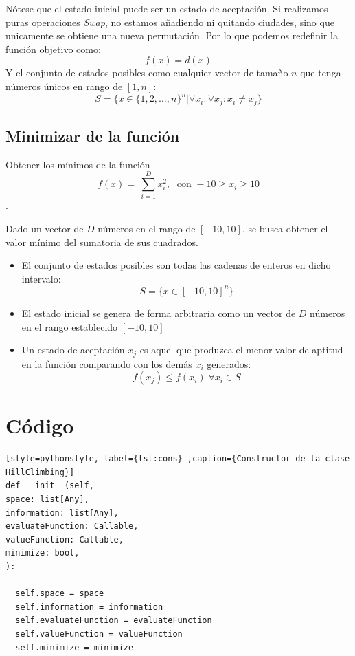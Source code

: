 \documentclass[12pt,twoside]{article}
\begin{document}
	
	
	Nótese que el estado inicial puede ser un estado de aceptación. Si realizamos puras operaciones \textit{Swap}, no estamos añadiendo ni quitando ciudades, sino que unicamente se obtiene una nueva permutación. Por lo que podemos redefinir la función objetivo como: \[ f(x) = d(x) \] Y el conjunto de estados posibles como cualquier vector de tamaño $n$ que tenga números únicos en rango de $[1,n]$: \[ S = \{ x \in \{1, 2, \dots, n  \}^n | \forall x_i \colon \forall x_j \colon x_i \neq x_j \}\]
	
	\subsection{Minimizar de la función}
	
	Obtener los mínimos de la función \[ f(x) = \ \sum_{i = 1}^{D} x_i^2, \; \text{ con } -10 \geq x_i \geq 10 \].
	
	Dado un vector de $D$ números en el rango de $[-10, 10]$, se busca obtener el valor mínimo del sumatoria  de sus cuadrados.
	
	\begin{itemize}
		\item El conjunto de estados posibles son todas las cadenas de enteros en dicho intervalo: \[ S = \{ x \in [-10, 10]^n \} \]
		
		\item El estado inicial se genera de forma arbitraria como un vector de $D$ números en el rango establecido $[-10, 10]$
		
		\item Un estado de aceptación $x_j$ es aquel que produzca el menor valor de aptitud en la función comparando con los demás $x_i$ generados: \[ f(x_j) \leq f(x_i) \; \forall x_i \in S\] 
	\end{itemize}

\section{Código}

\begin{lstlisting}[style=pythonstyle, label={lst:cons} ,caption={Constructor de la clase HillClimbing}]
def __init__(self, 
space: list[Any],
information: list[Any],
evaluateFunction: Callable,
valueFunction: Callable,
minimize: bool,
): 

  self.space = space
  self.information = information
  self.evaluateFunction = evaluateFunction
  self.valueFunction = valueFunction
  self.minimize = minimize  
\end{lstlisting}
\end{document}
